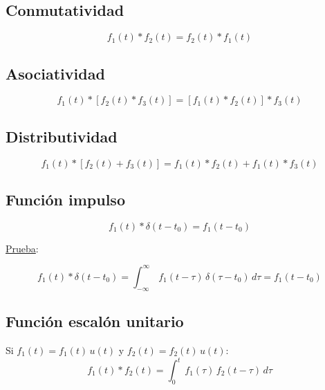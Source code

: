 \subsection{Conmutatividad}
\begin{equation}
    f_1(t)*f_2(t)=f_2(t)*f_1(t)
\end{equation}

\subsection{Asociatividad}
\begin{equation}
    f_1(t)*[f_2(t)*f_3(t)]=[f_1(t)*f_2(t)]*f_3(t)
\end{equation}

\subsection{Distributividad}
\begin{equation}
    f_1(t)*[f_2(t)+f_3(t)]=f_1(t)*f_2(t)+f_1(t)*f_3(t)
\end{equation}

\subsection{Función impulso}
\begin{equation}
    f_1(t)*\delta(t-t_0)=f_1(t-t_0)
\end{equation}

\underline{Prueba}:

\begin{equation*}
    f_1(t)*\delta(t-t_0)
    =\int_{-\infty}^{\infty}\,f_1(t-\tau)\,\delta(\tau-t_0)\,d\tau
    =f_1(t-t_0)
\end{equation*}

\subsection{Función escalón unitario}
Si $f_1(t)=f_1(t)\,u(t)$ y $f_2(t)=f_2(t)\,u(t)$:
\begin{equation}
    f_1(t)*f_2(t)=\int_0^t\,f_1(\tau)\,f_2(t-\tau)\,d\tau
\end{equation}

\begin{figure}[H]
    \centering
    \begin{minipage}{.4\textwidth}
        \centering
        
    \end{minipage}
    \begin{minipage}{.4\textwidth}
        \centering
        
    \end{minipage}
\end{figure}

